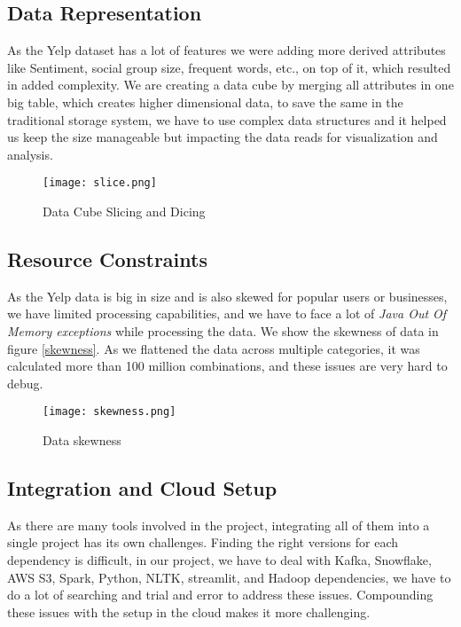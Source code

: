 \documentclass[conference]{IEEEtran}
\begin{document}
\subsection{Data Representation} 
As the Yelp dataset has a lot of features we were adding more derived attributes like Sentiment, social group size, frequent words, etc., on top of it, which resulted in added complexity. We are creating a data cube by merging all attributes in one big table, which creates higher dimensional data, to save the same in the traditional storage system, we have to use complex data structures and it helped us keep the size manageable but impacting the data reads for visualization and analysis. 

\begin{figure*}[h]
  \centering
  \texttt{[image: slice.png]}
  \caption{Data Cube Slicing and Dicing }
\end{figure*}

\subsection{Resource Constraints} 
As the Yelp data is big in size and is also skewed for popular users or businesses, we have limited processing capabilities, and we have to face a lot of \textit{Java Out Of Memory exceptions} while processing the data. We show the skewness of data in figure \ref{skewness}. As we flattened the data across multiple categories, it was calculated more than 100 million combinations, and these issues are very hard to debug. 

\begin{figure}[h]
  \centering
  \texttt{[image: skewness.png]}
  \caption{Data skewness }
\end{figure}

\subsection{Integration and Cloud Setup} 
As there are many tools involved in the project, integrating all of them into a single project has its own challenges. Finding the right versions for each dependency is difficult, in our project, we have to deal with Kafka, Snowflake, AWS S3, Spark, Python, NLTK, streamlit, and Hadoop dependencies, we have to do a lot of searching and trial and error to address these issues. Compounding these issues with the setup in the cloud makes it more challenging. 
    
\end{document}
